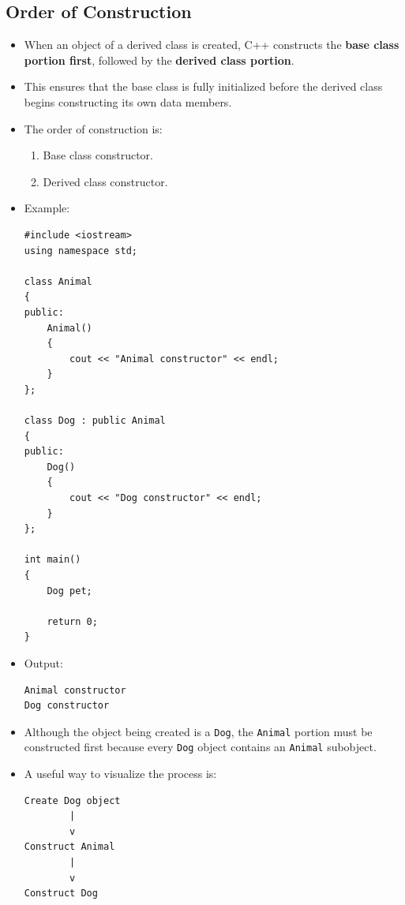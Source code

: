\documentclass[10pt]{article}
\begin{document}
\newpage

\subsection{Order of Construction}
\begin{itemize}
    \item When an object of a derived class is created, C++ constructs the
    \textbf{base class portion first}, followed by the \textbf{derived class portion}.

    \item This ensures that the base class is fully initialized before the
    derived class begins constructing its own data members.

    \item The order of construction is:
    \begin{enumerate}
        \item Base class constructor.
        \item Derived class constructor.
    \end{enumerate}

    \item Example:

\begin{verbatim}
#include <iostream>
using namespace std;

class Animal
{
public:
    Animal()
    {
        cout << "Animal constructor" << endl;
    }
};

class Dog : public Animal
{
public:
    Dog()
    {
        cout << "Dog constructor" << endl;
    }
};

int main()
{
    Dog pet;

    return 0;
}
\end{verbatim}

    \item Output:

\begin{verbatim}
Animal constructor
Dog constructor
\end{verbatim}

    \item Although the object being created is a \verb|Dog|, the
    \verb|Animal| portion must be constructed first because every
    \verb|Dog| object contains an \verb|Animal| subobject.

    \item A useful way to visualize the process is:

\begin{verbatim}
Create Dog object
        |
        v
Construct Animal
        |
        v
Construct Dog
\end{verbatim}
\end{itemize}
\end{document}
